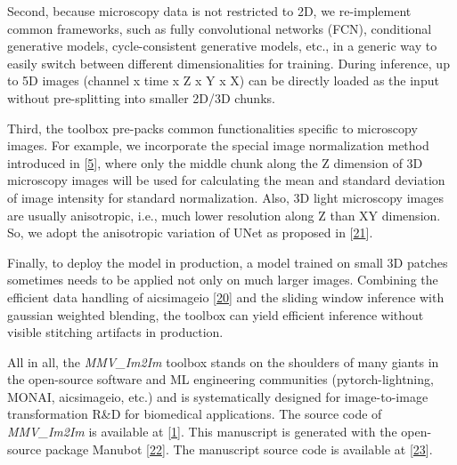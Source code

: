 Second, because microscopy data is not restricted to 2D, we re-implement common frameworks, such as fully convolutional networks (FCN), conditional generative models, cycle-consistent generative models, etc., in a generic way to easily switch between different dimensionalities for training. During inference, up to 5D images (channel x time x Z x Y x X) can be directly loaded as the input without pre-splitting into smaller 2D/3D chunks.

Third, the toolbox pre-packs common functionalities specific to microscopy images. For example, we incorporate the special image normalization method introduced in {[}\protect\hyperlink{ref-Yq8wZ6hc}{5}{]}, where only the middle chunk along the Z dimension of 3D microscopy images will be used for calculating the mean and standard deviation of image intensity for standard normalization. Also, 3D light microscopy images are usually anisotropic, i.e., much lower resolution along Z than XY dimension. So, we adopt the anisotropic variation of UNet as proposed in {[}\protect\hyperlink{ref-jM3v1UjQ}{21}{]}.

Finally, to deploy the model in production, a model trained on small 3D patches sometimes needs to be applied not only on much larger images. Combining the efficient data handling of aicsimageio {[}\protect\hyperlink{ref-gsfWGJKf}{20}{]} and the sliding window inference with gaussian weighted blending, the toolbox can yield efficient inference without visible stitching artifacts in production.

All in all, the \emph{MMV\_Im2Im} toolbox stands on the shoulders of many giants in the open-source software and ML engineering communities (pytorch-lightning, MONAI, aicsimageio, etc.) and is systematically designed for image-to-image transformation R\&D for biomedical applications. The source code of \emph{MMV\_Im2Im} is available at {[}\protect\hyperlink{ref-10dtMviwb}{1}{]}. This manuscript is generated with the open-source package Manubot {[}\protect\hyperlink{ref-YuJbg3zO}{22}{]}. The manuscript source code is available at {[}\protect\hyperlink{ref-B5mAMFLK}{23}{]}.

